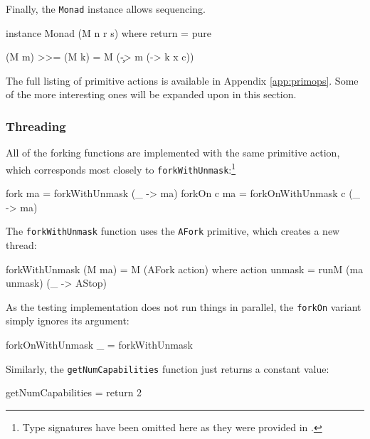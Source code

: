 Finally, the \verb|Monad| instance allows sequencing.

\begin{haskellcode}
instance Monad (M n r s) where
  return = pure

  (M m) >>= (M k) = M (\c -> m (\x -> k x c))
\end{haskellcode}

The full listing of primitive actions is available in Appendix
\ref{app:primops}. Some of the more interesting ones will be expanded
upon in this section.

\subsubsection{Threading}
\label{sec:execution-primops-threading}

All of the forking functions are implemented with the same primitive
action, which corresponds most closely to
\verb|forkWithUnmask|:\footnote{Type signatures have been omitted here
  as they were provided in .}

\begin{haskellcode}
fork     ma = forkWithUnmask     (\_ -> ma)
forkOn c ma = forkOnWithUnmask c (\_ -> ma)
\end{haskellcode}

The \verb|forkWithUnmask| function uses the \verb|AFork| primitive,
which creates a new thread:

\begin{haskellcode}
forkWithUnmask (M ma) = M (AFork action) where
  action unmask = runM (ma unmask) (\_ -> AStop)
\end{haskellcode}


As the testing implementation does not run things in parallel, the
\verb|forkOn| variant simply ignores its argument:

\begin{haskellcode}
forkOnWithUnmask _ = forkWithUnmask
\end{haskellcode}

Similarly, the \verb|getNumCapabilities| function just returns a
constant value:

\begin{haskellcode}
getNumCapabilities = return 2
\end{haskellcode}

